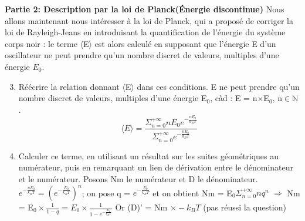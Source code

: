 \documentclass{article}
\begin{document}
\newpage
\textbf{Partie 2: Description par la loi de Planck(Énergie discontinue)}\newline
Nous allons maintenant nous intéresser à la loi de Planck, qui a proposé de corriger la loi de Rayleigh-Jeans en introduisant la quantification de l'énergie du système corps noir : le terme $\langle$E$\rangle$ est alors calculé en supposant que l'énergie E d'un oscillateur ne peut prendre qu'un nombre discret de valeurs, multiples d'une énergie $E_{0}$.
\begin{enumerate}
    \setcounter{enumi}{2}
    \item Réécrire la relation donnant $\langle$E$\rangle$ dans ces conditions.\newline
    E ne peut prendre qu'un nombre discret de valeurs, multiples d'une énergie E$_{0}$, càd : E = n$\times$E$_{0}$, n$\in \mathbb{N}$.
    \[ \langle E \rangle = \frac{\Sigma_{n=0}^{+\infty} nE_{0}e^{-\frac{nE_{0}}{k_{B}T}}}{\Sigma_{n=0}^{+\infty} e^{-\frac{nE_{0}}{k_{B}T}}} \]
    \item Calculer ce terme, en utilisant un résultat sur les suites géométriques au numérateur, puis en remarquant un lien de dérivation entre le dénominateur et le numérateur.\newline\newline
    Posons Nm le numérateur et D le dénominateur.\newline
    $e^{-\frac{nE_{0}}{k_{B}T}} = {(e^{-\frac{E_{0}}{k_{B}T}})}^{n}$; on pose q = $e^{-\frac{E_{0}}{k_{B}T}}$ et on obtient Nm = E$_{0} \Sigma_{n=0}^{+\infty} nq^{n}$\newline\newline
    $\Longrightarrow$ Nm = E$_{0} \times \frac{1}{1-q} = E_{0} \times \frac{1}{1-e^{-\frac{E_{0}}{k_{B}T}}}$\newline\newline
    Or (D)' = Nm $\times -k_{B}T$ (pas réussi la question)


\end{enumerate}
\end{document}
